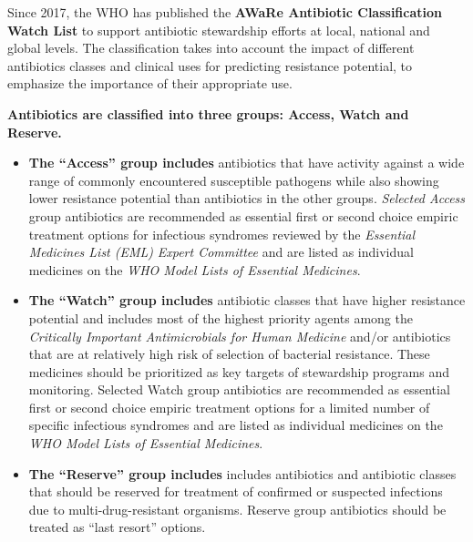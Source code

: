 \documentclass[
  11pt,
  paper=a4,
  ,captions=tableheading
]{scrartcl}
\begin{document}
Since 2017, the WHO has published the \textbf{AWaRe Antibiotic
Classification Watch List} to support antibiotic stewardship efforts at
local, national and global levels. The classification takes into account
the impact of different antibiotics classes and clinical uses for
predicting resistance potential, to emphasize the importance of their
appropriate use.

\textbf{Antibiotics are classified into three groups: Access, Watch and
Reserve.}

\begin{itemize}
\item
  \textbf{The ``Access'' group includes} antibiotics that have activity
  against a wide range of commonly encountered susceptible pathogens
  while also showing lower resistance potential than antibiotics in the
  other groups. \emph{Selected Access} group antibiotics are recommended
  as essential first or second choice empiric treatment options for
  infectious syndromes reviewed by the \emph{Essential Medicines List
  (EML)} \emph{Expert Committee} and are listed as individual medicines
  on the \emph{WHO Model Lists of Essential Medicines}.
\item
  \textbf{The ``Watch'' group includes} antibiotic classes that have
  higher resistance potential and includes most of the highest priority
  agents among the \emph{Critically Important Antimicrobials for Human
  Medicine} and/or antibiotics that are at relatively high risk of
  selection of bacterial resistance. These medicines should be
  prioritized as key targets of stewardship programs and monitoring.
  Selected Watch group antibiotics are recommended as essential first or
  second choice empiric treatment options for a limited number of
  specific infectious syndromes and are listed as individual medicines
  on the \emph{WHO Model Lists of Essential Medicines}.
\item
  \textbf{The ``Reserve'' group includes} includes antibiotics and
  antibiotic classes that should be reserved for treatment of confirmed
  or suspected infections due to multi-drug-resistant organisms. Reserve
  group antibiotics should be treated as ``last resort'' options.


\end{itemize}
\end{document}
